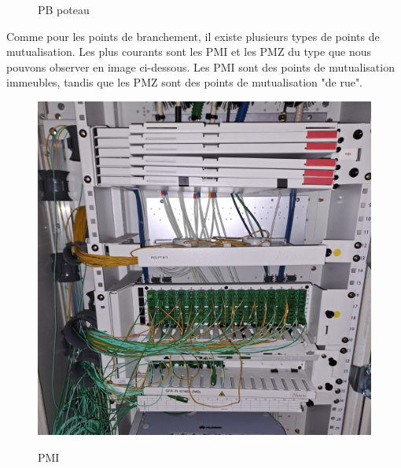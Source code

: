 \documentclass[12pt, a4paper]{article}
\begin{document}
\begin{figure}[htbp]
\begin{minipage}[b]{0.4\textwidth}
      \caption{PB poteau}
    \end{minipage}
\end{figure}

Comme pour les points de branchement, il existe plusieurs 
types de points de mutualisation. Les plus courants 
sont les \gls{PMI} et les \gls{PMZ} du type que nous pouvons 
observer en image ci-dessous. Les PMI sont des points de mutualisation
immeubles, tandis que les PMZ sont des points de mutualisation
"de rue".\\
\begin{figure}[htbp]
    \centering
    \begin{minipage}[b]{0.4\textwidth}
		{\includegraphics[width=\textwidth]{img/pmi.jpg}}
      \caption{PMI}
    \end{minipage}
    \hspace{0.5cm} %
    \begin{minipage}[b]{0.4\textwidth}

\end{minipage}
\end{figure}
\end{document}
